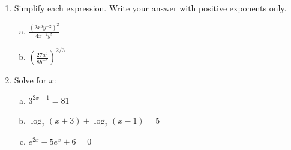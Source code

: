 \documentclass[11pt]{article}
\begin{document}
\begin{enumerate}[resume]
\item Simplify each expression. Write your answer with positive exponents only.
\begin{enumerate}[(a)]
  \item $\displaystyle \frac{(2x^3 y^{-2})^2}{4x^{-1} y^5}$

  \item $\displaystyle \left( \frac{27a^6}{8b^{-3}} \right)^{2/3}$
\end{enumerate}

\item Solve for $x$:
\begin{enumerate}[(a)]
  \item $3^{2x-1} = 81$
  \item $\log_2(x+3) + \log_2(x-1) = 5$
  \item $e^{2x} - 5e^x + 6 = 0$
\end{enumerate}
\end{enumerate}
\end{document}
